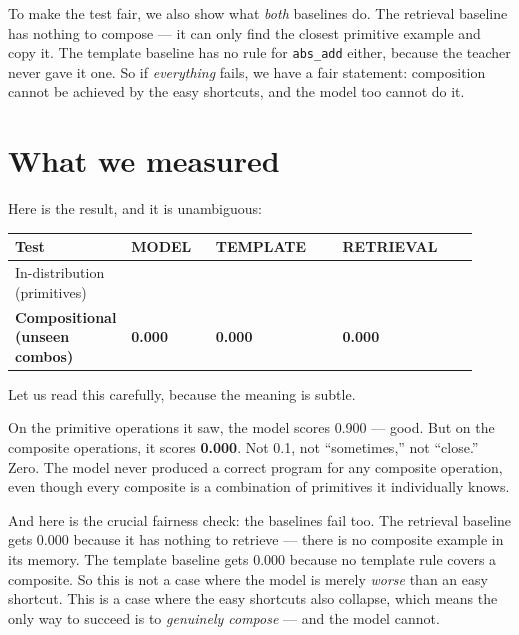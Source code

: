 To make the test fair, we also show what \emph{both} baselines do. The
retrieval baseline has nothing to compose --- it can only find the
closest primitive example and copy it. The template baseline has no rule
for \texttt{abs\_add} either, because the teacher never gave it one. So
if \emph{everything} fails, we have a fair statement: composition cannot
be achieved by the easy shortcuts, and the model too cannot do it.

\section{What we measured}\label{what-we-measured}

Here is the result, and it is unambiguous:

\begin{longtable}[]{@{}
  >{\raggedright\arraybackslash}p{0.1624\linewidth}
>{\raggedright\arraybackslash}p{0.1894\linewidth}
>{\raggedright\arraybackslash}p{0.2706\linewidth}
>{\raggedright\arraybackslash}p{0.2976\linewidth}
@{}}
\toprule\noalign{}
\begin{minipage}[b]{\linewidth}\raggedright
Test
\end{minipage} & \begin{minipage}[b]{\linewidth}\raggedright
MODEL
\end{minipage} & \begin{minipage}[b]{\linewidth}\raggedright
TEMPLATE
\end{minipage} & \begin{minipage}[b]{\linewidth}\raggedright
RETRIEVAL
\end{minipage} \\
\midrule\noalign{}
\endhead
\bottomrule\noalign{}
\endlastfoot
In-distribution (primitives) & 0.900 & 0.800 & 1.000 \\
\textbf{Compositional (unseen combos)} & \textbf{0.000} & \textbf{0.000}
& \textbf{0.000} \\
\end{longtable}

Let us read this carefully, because the meaning is subtle.

On the primitive operations it saw, the model scores 0.900 --- good. But
on the composite operations, it scores \textbf{0.000}. Not 0.1, not
``sometimes,'' not ``close.'' Zero. The model never produced a correct
program for any composite operation, even though every composite is a
combination of primitives it individually knows.

And here is the crucial fairness check: the baselines fail too. The
retrieval baseline gets 0.000 because it has nothing to retrieve ---
there is no composite example in its memory. The template baseline gets
0.000 because no template rule covers a composite. So this is not a case
where the model is merely \emph{worse} than an easy shortcut. This is a
case where the easy shortcuts also collapse, which means the only way to
succeed is to \emph{genuinely compose} --- and the model cannot.

